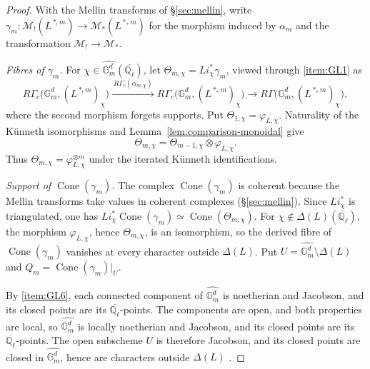 \documentclass[12pt,reqno]{amsart}
\theoremstyle{definition}
\theoremstyle{plain}
\theoremstyle{definition}
\theoremstyle{remark}
\newcommand{\bbG}{\mathbb{G}}  \newcommand{\bbH}{\mathbb{H}}
\newcommand{\bbQ}{\mathbb{Q}}  \newcommand{\bbR}{\mathbb{R}}
\newcommand{\ol}[1]{\overline{#1}}
\newcommand{\Ql}{\bbQ_{\ell}}
\newcommand{\Gm}{\bbG_m}
\newcommand{\Cone}{\operatorname{Cone}}
\begin{document}
\begin{proof}
With the Mellin transforms of \S\ref{sec:mellin}, write
\(\gamma_m\colon\mathscr M_!(L^{\ast_!m})\to\mathscr M_*(L^{\ast_*m})\) for the morphism induced by
\(\alpha_m\) and the transformation \(\mathscr M_!\to\mathscr M_*\).

\emph{Fibres of \(\gamma_m\).}  For \(\chi\in\widehat{\Gm^d}(\ol\Ql)\), let \(\Theta_{m,\chi}=Li_\chi^*\gamma_m\),
viewed through \ref{item:GL1} as
\[
        R\Gamma_c\bigl(\Gm^d,(L^{\ast_!m})_\chi\bigr)
        \xrightarrow{\ R\Gamma_c(\alpha_{m,\chi})\ }R\Gamma_c\bigl(\Gm^d,(L^{\ast_*m})_\chi\bigr)
        \longrightarrow R\Gamma\bigl(\Gm^d,(L^{\ast_*m})_\chi\bigr),
\]
where the second morphism forgets supports.  Put \(\Theta_{1,\chi}=\varphi_{L,\chi}\).  Naturality of the
K\"unneth isomorphisms and Lemma~\ref{lem:comparison-monoidal} give
\[
        \Theta_{m,\chi}=\Theta_{m-1,\chi}\otimes\varphi_{L,\chi}.
\]
Thus \(\Theta_{m,\chi}=\varphi_{L,\chi}^{\otimes m}\) under the iterated K\"unneth identifications.

\emph{Support of \(\Cone(\gamma_m)\).}  The complex \(\Cone(\gamma_m)\) is coherent because the Mellin
transforms take values in coherent complexes (\S\ref{sec:mellin}). Since \(Li_\chi^*\) is triangulated, one
has \(Li_\chi^*\Cone(\gamma_m)\simeq\Cone(\Theta_{m,\chi})\).  For \(\chi\notin\Delta(L)(\ol\Ql)\), the
morphism \(\varphi_{L,\chi}\), hence \(\Theta_{m,\chi}\), is an isomorphism, so the derived fibre of
\(\Cone(\gamma_m)\) vanishes at every character outside \(\Delta(L)\).  Put
\(U=\widehat{\Gm^d}\setminus\Delta(L)\) and \(Q_m=\Cone(\gamma_m)|_U\).

By \ref{item:GL6}, each connected component of \(\widehat{\Gm^d}\) is noetherian and Jacobson, and its
closed points are its \(\ol\Ql\)-points.  The components are open, and both properties are local, so
\(\widehat{\Gm^d}\) is locally noetherian and Jacobson, and its closed points are its
\(\ol\Ql\)-points.  The open subscheme \(U\) is therefore Jacobson, and its closed points are closed in
\(\widehat{\Gm^d}\), hence are characters outside \(\Delta(L)\) \cite[Tag~005X]{stacks-project}.


\end{proof}
\end{document}
